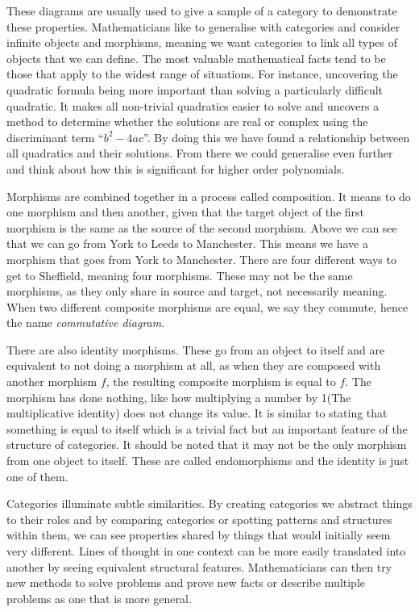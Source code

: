 These diagrams are usually used to give a sample of a category to demonstrate
these properties. Mathematicians like to generalise with categories and consider
infinite objects and morphisms, meaning we want categories to link all types of
objects that we can define. The most valuable mathematical facts tend to be
those that apply to the widest range of situations. For instance, uncovering the
quadratic formula being more important than solving a particularly difficult
quadratic. It makes all non-trivial quadratics easier to solve and uncovers a
method to determine whether the solutions are real or complex using the
discriminant term ``$b^2-4ac$''. By doing this we have found a relationship
between all quadratics and their solutions. From there we could generalise even
further and think about how this is significant for higher order polynomials. 

Morphisms are combined together in a process called composition. It means to do
one morphism and then another, given that the target object of the first
morphism is the same as the source of the second morphism. Above we can see that
we can go from York to Leeds to Manchester. This means we have a morphism that
goes from York to Manchester. There are four different ways to get to Sheffield,
meaning four morphisms. These may not be the same morphisms, as they only share
in source and target, not necessarily meaning. When two different composite
morphisms are equal, we say they commute, hence the name \emph{commutative
diagram}.

There are also identity morphisms. These go from an object to itself and are
equivalent to not doing a morphism at all, as when they are composed with
another morphism $f$, the resulting composite morphism is equal to $f$. The
morphism has done nothing, like how multiplying a number by 1(The multiplicative
identity) does not change its value. It is similar to stating that something is
equal to itself which is a trivial fact but an important feature of the
structure of categories. It should be noted that it may not be the only morphism
from one object to itself. These are called endomorphisms and the identity is
just one of them.

Categories illuminate subtle similarities. By creating categories we abstract
things to their roles and by comparing categories or spotting patterns and
structures within them, we can see properties shared by things that would
initially seem very different. Lines of thought in one context can be more
easily translated into another by seeing equivalent structural features.
Mathematicians can then try new methods to solve problems and prove new facts or
describe multiple problems as one that is more general.

